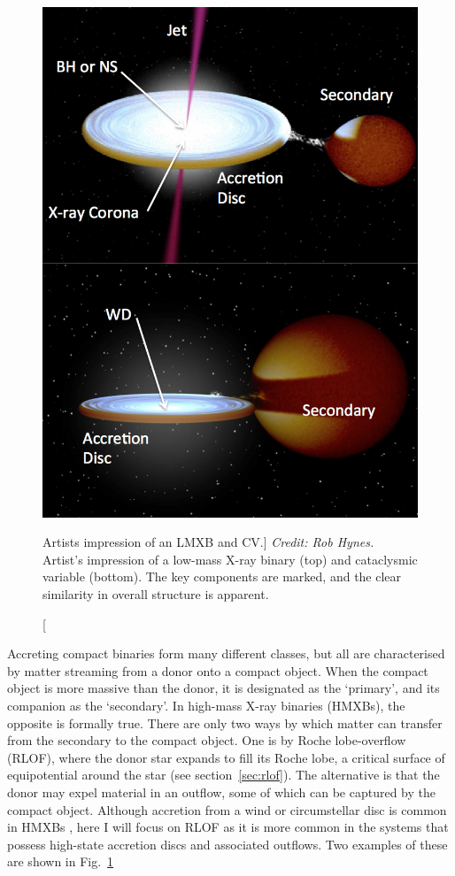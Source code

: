 \begin{figure}
\centering
\includegraphics[width=1.0\textwidth]{figures/01-intro/cv_and_xrb.png}
\caption
[Artists impression of an LMXB and CV.]
{
{\sl Credit: Rob Hynes.} 
Artist's impression of a low-mass X-ray binary (top) and
cataclysmic variable (bottom). The key components are marked,
and the clear similarity in overall structure is apparent.
} 
\label{fig:cv_and_xrb}
\end{figure}

Accreting compact binaries form many different classes, 
but all are characterised by matter streaming from a donor
onto a compact object. When the compact object is more massive 
than the donor, it is designated as the `primary', 
and its companion as the `secondary'. 
In high-mass X-ray binaries (HMXBs), the opposite is formally true.
There are only two ways by which matter can transfer 
from the secondary to the compact object. One is by Roche lobe-overflow (RLOF),
where the donor star expands to fill its Roche lobe, a critical surface
of equipotential around the star (see section~\ref{sec:rlof}). 
The alternative is that the donor may expel
material in an outflow, some of which can be captured by the compact object. 
Although accretion from a wind or circumstellar disc is common in 
HMXBs \citep{bartlett2013}, here I will focus on 
RLOF as it is more common in the systems that possess high-state accretion discs
and associated outflows. Two examples of these are shown in Fig.~\ref{fig:cv_and_xrb}

